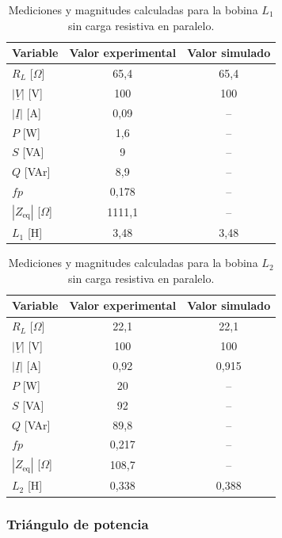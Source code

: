 \begin{table}[H]
    \centering
    \caption{Mediciones y magnitudes calculadas para la bobina $L_1$ sin carga resistiva en paralelo.}
    \label{tab:tp3_inductor_l1}
    \begin{tabular}{lcc}
        \toprule
        Variable & Valor experimental & Valor simulado \\
        \midrule
        $R_L$ [$\Omega$] & 65,4 & 65,4 \\
        $|\underline{V}|$ [V] & 100 & 100 \\
        $|\underline{I}|$ [A] & 0,09 & --\\
        $P$ [W] & 1,6 & --\\
        $S$ [VA] & 9 & --\\
        $Q$ [VAr] & 8,9 & --\\
        $fp$ & 0,178 & --\\
        $|Z_{\text{eq}}|$ [$\Omega$] & 1111,1 & --\\
        $L_1$ [H] & 3,48 & 3,48\\
        \bottomrule
    \end{tabular}
\end{table}

\begin{table}[H]
    \centering
    \caption{Mediciones y magnitudes calculadas para la bobina $L_2$ sin carga resistiva en paralelo.}
    \label{tab:tp3_inductor_l2}
    \begin{tabular}{lcc}
        \toprule
        Variable & Valor experimental & Valor simulado \\
        \midrule
        $R_L$ [$\Omega$] & 22,1 & 22,1\\
        $|\underline{V}|$ [V] & 100 & 100\\
        $|\underline{I}|$ [A] & 0,92 & 0,915\\
        $P$ [W] & 20 & --\\
        $S$ [VA] & 92 & --\\
        $Q$ [VAr] & 89,8 & --\\
        $fp$ & 0,217 & --\\
        $|Z_{\text{eq}}|$ [$\Omega$] & 108,7 & --\\
        $L_2$ [H] & 0,338 & 0,388\\
        \bottomrule
    \end{tabular}
\end{table}

\subsubsection{Triángulo de potencia}

